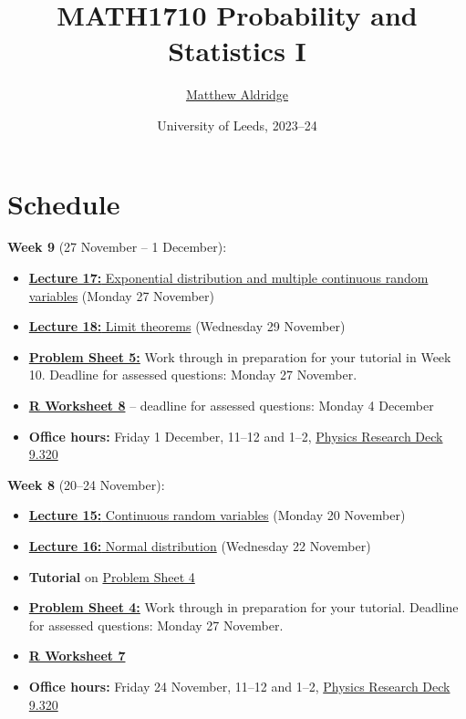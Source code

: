 \documentclass[
  a4paper,
]{book}
\title{MATH1710 Probability and Statistics I}
\author{\href{https://mpaldridge.github.io/}{Matthew Aldridge}}
\date{University of Leeds, 2023--24}
\providecommand{\tightlist}{%
  \setlength{\itemsep}{0pt}\setlength{\parskip}{0pt}}
\theoremstyle{definition}
\theoremstyle{definition}
\theoremstyle{definition}
\theoremstyle{definition}
\theoremstyle{remark}
\begin{document}
\maketitle

{
\setcounter{tocdepth}{1}
\tableofcontents
}
\hypertarget{schedule}{%
\chapter*{Schedule}\label{schedule}}

\newcommand{\Var}{\operatorname{Var}}

\textbf{Week 9} (27 November -- 1 December):

\begin{itemize}
\tightlist
\item
  \protect\hyperlink{L17-exponential-multi}{\textbf{Lecture 17:} Exponential distribution and multiple continuous random variables} (Monday 27 November)
\item
  \protect\hyperlink{L18-limit}{\textbf{Lecture 18:} Limit theorems} (Wednesday 29 November)
\item
  \protect\hyperlink{P5}{\textbf{Problem Sheet 5:}} Work through in preparation for your tutorial in Week 10. Deadline for assessed questions: Monday 27 November.
\item
  \protect\hyperlink{R}{\textbf{R Worksheet 8}} -- deadline for assessed questions: Monday 4 December
\item
  \textbf{Office hours:} Friday 1 December, 11--12 and 1--2, \href{https://mpaldridge.github.io/office.html}{Physics Research Deck 9.320}
\end{itemize}

\textbf{Week 8} (20--24 November):

\begin{itemize}
\tightlist
\item
  \protect\hyperlink{L15-continuous}{\textbf{Lecture 15:} Continuous random variables} (Monday 20 November)
\item
  \protect\hyperlink{L16-normal}{\textbf{Lecture 16:} Normal distribution} (Wednesday 22 November)
\item
  \textbf{Tutorial} on \protect\hyperlink{P4}{Problem Sheet 4}
\item
  \protect\hyperlink{P4}{\textbf{Problem Sheet 4:}} Work through in preparation for your tutorial. Deadline for assessed questions: Monday 27 November.
\item
  \protect\hyperlink{R}{\textbf{R Worksheet 7}}
\item
  \textbf{Office hours:} Friday 24 November, 11--12 and 1--2, \href{https://mpaldridge.github.io/office.html}{Physics Research Deck 9.320}
\end{itemize}
\end{document}
